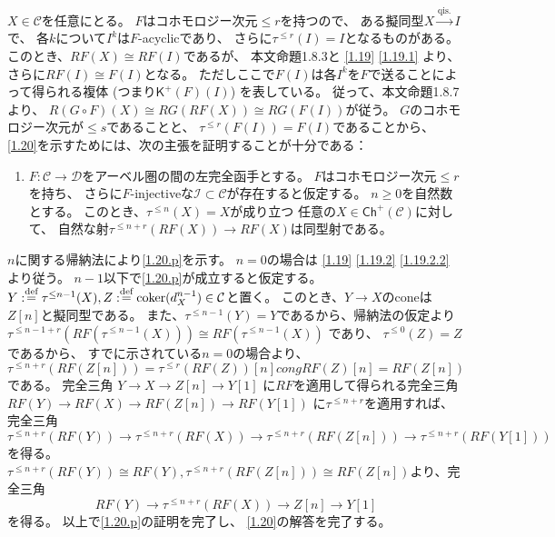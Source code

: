 \documentclass[uplatex,dvipdfmx]{jsarticle}
\makeatletter
\theoremstyle{definition}
\renewenvironment{proof}[1][\proofname]{
  \pushQED{\qed}%
  \normalfont \topsep6\p@\@plus6\p@\relax
  \trivlist
  \item[\hskip\labelsep
    #1\@addpunct{\textbf{.}}]\ignorespaces
}{%
  \popQED\endtrivlist\@endpefalse
}
\providecommand{\proofname}{証明}
\DeclareMathOperator{\coker}{\mathrm{coker}}
\newcommand{\Ch}{\mathsf{Ch}}
\newcommand{\sfK}{\mathsf{K}}
\newcommand\mcC{\mathcal{C}}
\newcommand\mcD{\mathcal{D}}
\newcommand\mcI{\mathcal{I}}
\def\dfn{:\overset{\mbox{{\scriptsize def}}}{=}}
\makeatother
\begin{document}
\begin{proof}
  \(X\in \mcC\)を任意にとる。
  \(F\)はコホモロジー次元\(\leq r\)を持つので、
  ある擬同型\(X\xrightarrow{\text{qis.}} I\)で、
  各\(k\)について\(I^k\)は\(F\)-acyclicであり、
  さらに\(\tau^{\leq r}(I) = I\)となるものがある。
  このとき、\(RF(X) \cong RF(I)\)であるが、
  本文命題1.8.3と \autoref{1.19} \ref{1.19.1} より、
  さらに\(RF(I)\cong F(I)\)となる。
  ただしここで\(F(I)\)は各\(I^k\)を\(F\)で送ることによって得られる複体
  (つまり\(\sfK^+(F)(I)\)) を表している。
  従って、本文命題1.8.7より、
  \(R(G\circ F)(X)\cong RG(RF(X)) \cong RG(F(I))\)が従う。
  \(G\)のコホモロジー次元が\(\leq s\)であることと、
  \(\tau^{\leq r}(F(I)) = F(I)\)であることから、
  \autoref{1.20}を示すためには、次の主張を証明することが十分である：
  \begin{enumerate}[label=(\fnsymbol*),start=2]
    \item \label{1.20.p}
    \(F:\mcC\to \mcD\)をアーベル圏の間の左完全函手とする。
    \(F\)はコホモロジー次元\(\leq r\)を持ち、
    さらに\(F\)-injectiveな\(\mcI\subset \mcC\)が存在すると仮定する。
    \(n\geq 0\)を自然数とする。
    このとき、\(\tau^{\leq n}(X) = X\)が成り立つ
    任意の\(X\in \Ch^+(\mcC)\)に対して、
    自然な射\(\tau^{\leq n+r}(RF(X)) \to RF(X)\)は同型射である。
  \end{enumerate}
  \(n\)に関する帰納法により\ref{1.20.p}を示す。
  \(n=0\)の場合は \autoref{1.19} \ref{1.19.2} \ref{1.19.2.2} より従う。
  \(n-1\)以下で\ref{1.20.p}が成立すると仮定する。
  \(Y\dfn \tau^{\leq n-1}(X), Z\dfn \coker(d_X^{n-1})\in \mcC\)と置く。
  このとき、\(Y\to X\)のconeは\(Z[n]\)と擬同型である。
  また、\(\tau^{\leq n-1}(Y)=Y\)であるから、帰納法の仮定より
  \(\tau^{\leq n-1+r}(RF(\tau^{\leq n-1}(X))) \cong RF(\tau^{\leq n-1}(X))\)
  であり、
  \(\tau^{\leq 0}(Z) = Z\)であるから、
  すでに示されている\(n=0\)の場合より、
  \(\tau^{\leq n+r}(RF(Z[n])) = \tau^{\leq r}(RF(Z))[n]
  cong RF(Z)[n] = RF(Z[n])\)である。
  完全三角
  \(Y\to X \to Z[n] \to Y[1]\)
  に\(RF\)を適用して得られる完全三角
  \(RF(Y) \to RF(X) \to RF(Z[n]) \to RF(Y[1])\)
  に\(\tau^{\leq n+r}\)を適用すれば、
  完全三角
  \[
  \tau^{\leq n+r}(RF(Y)) \to \tau^{\leq n+r}(RF(X)) \to
  \tau^{\leq n+r}(RF(Z[n])) \to \tau^{\leq n+r}(RF(Y[1]))
  \]
  を得る。
  \(\tau^{\leq n+r}(RF(Y)) \cong RF(Y),
  \tau^{\leq n+r}(RF(Z[n])) \cong RF(Z[n])\)より、完全三角
  \[
  RF(Y) \to \tau^{\leq n+r}(RF(X)) \to Z[n] \to Y[1]
  \]
  を得る。
  以上で\ref{1.20.p}の証明を完了し、
  \autoref{1.20}の解答を完了する。
\end{proof}
\end{document}

